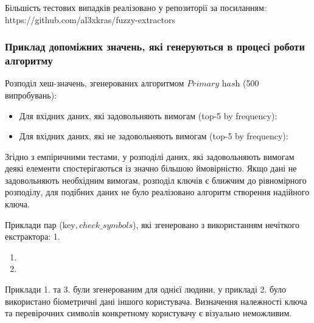 \documentclass[11pt]{article}
\providecommand{\tightlist}{%
      \setlength{\itemsep}{0pt}\setlength{\parskip}{0pt}}
\begin{document}
Більшість тестових випадків реалізовано у репозиторії за посиланням:
https://github.com/al3xkras/fuzzy-extractors

    \hypertarget{ux43fux440ux438ux43aux43bux430ux434-ux434ux43eux43fux43eux43cux456ux436ux43dux438ux445-ux437ux43dux430ux447ux435ux43dux44c-ux44fux43aux456-ux433ux435ux43dux435ux440ux443ux44eux442ux44cux441ux44f-ux432-ux43fux440ux43eux446ux435ux441ux456-ux440ux43eux431ux43eux442ux438-ux430ux43bux433ux43eux440ux438ux442ux43cux443}{%
\subsubsection{Приклад допоміжних значень, які генеруються в процесі
роботи
алгоритму}\label{ux43fux440ux438ux43aux43bux430ux434-ux434ux43eux43fux43eux43cux456ux436ux43dux438ux445-ux437ux43dux430ux447ux435ux43dux44c-ux44fux43aux456-ux433ux435ux43dux435ux440ux443ux44eux442ux44cux441ux44f-ux432-ux43fux440ux43eux446ux435ux441ux456-ux440ux43eux431ux43eux442ux438-ux430ux43bux433ux43eux440ux438ux442ux43cux443}}

    Розподіл хеш-значень, згенерованих алгоритмом \(\textit{Primary hash}\)
(500 випробувань):

\begin{itemize}
\tightlist
\item
  Для вхідних даних, які задовольняють вимогам (top-5 by frequency):
\item
  Для вхідних даних, які не задовольняють вимогам (top-5 by frequency):
\end{itemize}

Згідно з емпіричними тестами, у розподілі даних, які задовольняють
вимогам деякі елементи спостерігаються із значно більшою ймовірністю.
Якщо дані не задовольняють необхідним вимогам, розподіл ключів є ближчим
до рівномірного розподілу, для подібних даних не було реалізовано
алгоритм створення надійного ключа.

    Приклади пар (\(\text{key},check\_symbols\)), які згенеровано з
використанням нечіткого екстрактора: 1.

\begin{enumerate}
\def\labelenumi{\arabic{enumi}.}
\setcounter{enumi}{1}
\item
\item
\end{enumerate}

Приклади 1. та 3. були згенерованим для однієї людини, у прикладі 2.
було використано біометричні дані іншого користувача. Визначення
належності ключа та перевірочних символів конкретному користувачу є
візуально неможливим.
\end{document}
